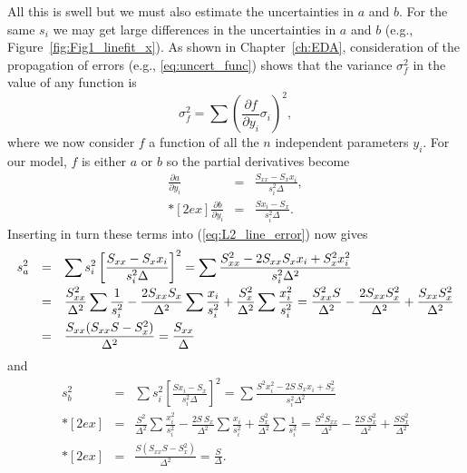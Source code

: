    All this is swell but we must also estimate the uncertainties in $a$ and $b$.  For the same $s_i$ we 
may get large differences in the uncertainties in $a$ and $b$ (e.g., Figure~\ref{fig:Fig1_linefit_x}).
As shown in Chapter~\ref{ch:EDA}, consideration of the propagation of errors (e.g., \ref{eq:uncert_func}) shows
that the variance $\sigma_f^2$ in the value of any function is
\begin{equation}
\sigma^2_f = \sum \left ( \frac{\partial f}{\partial y_i} \sigma_i \right )^2,
\label{eq:L2_line_error}
\end{equation}
where we now consider $f$ a function of all the $n$ independent parameters $y_i$. For our model,
$f$ is either $a$ or $b$ so the partial derivatives become
\begin{equation}
\begin{array}{rcl}
\displaystyle \frac{\partial a}{\partial y_i} & = & \displaystyle \frac{S_{xx} - S_x x_i}{s ^2_i \Delta},\\*[2ex]
\displaystyle \frac{\partial b}{\partial y_i} & = & \displaystyle \frac{Sx_{i} - S_x}{s ^2_i \Delta}.
\end{array}
\end{equation}
Inserting in turn these terms into (\ref{eq:L2_line_error}) now gives
\begin{equation}
\begin{array}{rcl} 
\displaystyle
\displaystyle s^2_a & = & \displaystyle \sum s^2_i \left [ \frac{S_{xx} - S_{x} x_i}{s ^2_i \Delta} \right ] ^2 = \sum \frac{S^2_{xx} - 2S_{xx}S_{x}x_i + S^2_x x^2_i}{s^2_i \Delta ^2}\\*[2ex]
& = & \displaystyle \frac{S^2_{xx}}{\Delta^2} \sum \frac{1}{s^2_i} - \frac{2S_{xx}S_x}{\Delta^2}
\sum \frac{x_i}{s^2_i} + \frac{S^2_x}{\Delta^2} \sum \frac{x^2_i}{s^2_i}= \frac{S^2_{xx}S}{\Delta^2} - \frac{2S_{xx}S^2_x}{\Delta ^2} + \frac{S_{xx}S^2_x}{\Delta^2} \\*[2ex]
& = & \displaystyle \frac{S_{xx} (S_{xx}S-S^2_x)}{\Delta^2} = \frac{S_{xx}}{\Delta}
\end{array}
\end{equation}
and	
\begin{equation}
\begin{array}{rcl}
\displaystyle s^2_b & = & \displaystyle \sum s^2_i \left [ \frac{Sx_i - S_x}{s^2_i \Delta} \right ] ^2 =
\sum \frac{S^2x^2_i - 2S \ S_x x_i + S^2_x}{s^2_i \Delta^2}\\*[2ex]
 &  = & \displaystyle \frac{S^2}{\Delta^2}\sum \frac{x^2_i}{s^2_i} - 
\frac{2S \ S_x}{\Delta^2} \sum \frac{x_i}{s^2_i} + \frac{S^2_x}{\Delta^2} \sum \frac{1}{s^2_i} = \frac{S^2S_{xx}}{\Delta^2} - \frac{2S \ S^2_x}{\Delta^2} + \frac{S S^2_x}{\Delta ^2}\\*[2ex]
& = & \displaystyle \frac{S(S_{xx}S - S^2_x)}{\Delta^2} = \frac{S}{\Delta}.
\label{eq:err_in_slope}
\end{array}
\end{equation}
